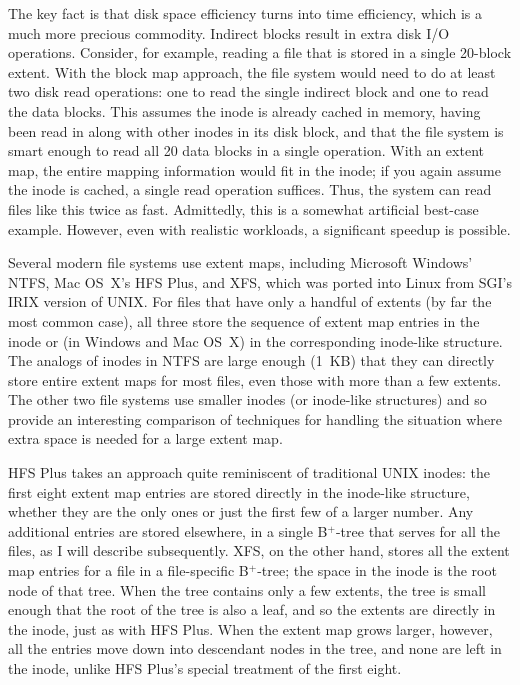 The key fact is that disk space efficiency turns into time efficiency,
which is a much more precious commodity.  Indirect blocks result in
extra disk I/O operations.  Consider, for example, reading a file that
is stored in a single 20-block extent.  With the block map
approach, the file system would need to do at least two disk read
operations: one to read the single indirect block and one to read the
data blocks.  This assumes the inode is already cached in memory,
having been read in along with other inodes in its disk block, and
that the file system is smart enough to read all 20 data blocks in
a single operation.  With an extent map, the entire mapping
information would fit in the inode; if you again assume the inode is
cached, a single read operation suffices.  Thus, the system can read
files like this twice as fast.  Admittedly, this is a somewhat
artificial best-case example.  However, even with realistic workloads,
a significant speedup is possible.

Several modern file systems use extent maps, including Microsoft
Windows' NTFS, Mac OS~X's HFS Plus, and XFS, which was ported into
Linux from SGI's IRIX version of UNIX.  For files that have only a
handful of extents (by far the most common case), all three store the
sequence of extent map entries in the inode or (in Windows and Mac
OS~X) in the corresponding inode-like structure.  The analogs of inodes in
NTFS are large enough (1~KB) that they can directly store entire
extent maps for most files, even those with more than a few extents. The other
two file systems use smaller inodes (or inode-like structures) and so
provide an interesting comparison of techniques for handling the
situation where extra space is needed for a large extent map.

HFS Plus takes an approach quite reminiscent of traditional UNIX
inodes: the first eight extent map entries are stored directly in the
inode-like structure, whether they are the only ones or just the first
few of a larger number.  Any additional entries are stored elsewhere,
in a single B${}^+$-tree that serves for all the files, as I will describe
subsequently.  XFS, on the other hand, stores all the extent map entries for
a file in a file-specific B${}^+$-tree; the space in the inode is the root
node of that tree.  When the tree contains only a few extents, the
tree is small enough that the
root of the tree is also a leaf, and so the extents are directly in
the inode, just as with HFS Plus.  When the extent map grows larger,
however, all the entries move down into descendant nodes in the tree,
and none are left in the inode, unlike HFS Plus's special treatment of
the first eight.

